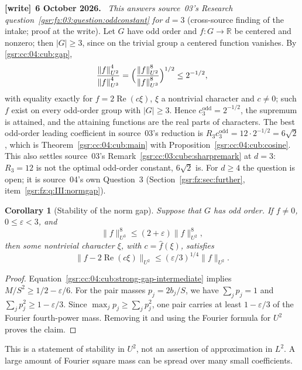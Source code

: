 \documentclass[11pt,letterpaper]{article}
\numberwithin{equation}{section}
\newtheorem{corollary}[theorem]{Corollary}
\theoremstyle{definition}
\theoremstyle{remark}
\newcommand{\R}{\mathbb R}
\newcommand{\1}{\mathbf 1}
\newcommand{\norm}[1]{\left\|#1\right\|}
\newenvironment{writenote}[1][]{\par\smallskip\begingroup\small
 \noindent\textbf{[write]}\if\relax\detokenize{#1}\relax\else~\textbf{#1.}\fi\ }%
 {\par\endgroup\smallskip}
\begin{document}
\begin{writenote}[6 October 2026]
\emph{This answers source~03's Research question~\ref{gsr:fz:03:question:oddconstant} for $d=3$} (cross-source finding of the intake; proof at the write). Let $G$ have odd order and $f:G\to\R$ be centered and nonzero; then $|G|\ge3$, since on the trivial group a centered function vanishes. By \eqref{gsr:cc:04:cub:gap},
\[
 \frac{\norm f_{U^2}^4}{\norm f_{U^3}^4}=\Bigl(\frac{\norm f_{U^2}^8}{\norm f_{U^3}^8}\Bigr)^{1/2}\le2^{-1/2},
\]
with equality exactly for $f=2\operatorname{Re}(c\xi)$, $\xi$ a nontrivial character and $c\ne0$; such $f$ exist on every odd-order group with $|G|\ge3$. Hence $c_3^{\mathrm{odd}}=2^{-1/2}$, the supremum is attained, and the attaining functions are the real parts of characters. The best odd-order leading coefficient in source~03's reduction is $R_3c_3^{\mathrm{odd}}=12\cdot2^{-1/2}=6\sqrt2$, which is Theorem~\ref{gsr:cc:04:cub:main} with Proposition~\ref{gsr:cc:04:cub:cosine}. This also settles source~03's Remark~\ref{gsr:cc:03:cube:sharpremark} at $d=3$: $R_3=12$ is not the optimal odd-order constant, $6\sqrt2$ is. For $d\ge4$ the question is open; it is source~04's own Question~3 (Section~\ref{gsr:fz:sec:further}, item~\ref{gsr:fz:q:III:normgap}).
\end{writenote}

\begin{corollary}[Stability of the norm gap]
\label{gsr:cc:04:cub:gap-stability}
Suppose that \(G\) has odd order.  If $f\ne0$, $0\leq\varepsilon<3$, and
\[
 \|f\|_{U^3}^8\leq(2+\varepsilon)\|f\|_{U^2}^8,
\]
then some nontrivial character $\xi$, with $c=\widehat f(\xi)$, satisfies
\begin{equation}
 \|f-2\operatorname{Re}(c\xi)\|_{U^2}
       \leq(\varepsilon/3)^{1/4}\|f\|_{U^2}.
 \label{gsr:cc:04:cub:stability}
\end{equation}
\end{corollary}

\begin{proof}
Equation~\eqref{gsr:cc:04:cub:strong-gap-intermediate} implies
$M/S^2\geq1/2-\varepsilon/6$. For the pair masses $p_j=2b_j/S$, we have
$\sum_jp_j=1$ and $\sum_jp_j^2\geq1-\varepsilon/3$.
Since $\max_jp_j\geq\sum_jp_j^2$, one pair carries at least
$1-\varepsilon/3$ of the Fourier fourth-power mass. Removing it and using
the Fourier formula for $U^2$ proves the claim.
\end{proof}

This is a statement of stability in $U^2$, not an assertion of approximation
in $L^2$. A large amount of Fourier square mass can be spread over many
small coefficients.
\end{document}

